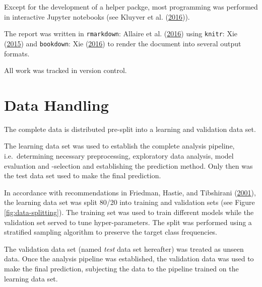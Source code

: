 \documentclass[
  11pt,
  a4paper,
  DIV=12,captions=tableheading,oneside,titlepage=firstiscover,abstracton]{scrreprt}
\begin{document}
Except for the development of a helper packge, most programming was performed in interactive Jupyter notebooks (see Kluyver et al. (\protect\hyperlink{ref-Kluyver:2016aa}{2016})).

The report was written in \texttt{rmarkdown}: Allaire et al. (\protect\hyperlink{ref-allaire2016rmarkdown}{2016}) using \texttt{knitr}: Xie (\protect\hyperlink{ref-xie2015}{2015}) and \texttt{bookdown}: Xie (\protect\hyperlink{ref-xie2016bookdown}{2016}) to render the document into several output formats.

All work was tracked in version control.

\hypertarget{data-handling}{%
\section{Data Handling}\label{data-handling}}

The complete data is distributed pre-split into a learning and validation data set.

The learning data set was used to establish the complete analysis pipeline, i.e.~determining necessary preprocessing, exploratory data analysis, model evaluation and -selection and establishing the prediction method. Only then was the test data set used to make the final prediction.

In accordance with recommendations in Friedman, Hastie, and Tibshirani (\protect\hyperlink{ref-friedman2001elements}{2001}), the learning data set was split 80/20 into training and validation sets (see Figure \ref{fig:data-splitting}). The training set was used to train different models while the validation set served to tune hyper-parameters. The split was performed using a stratified sampling algorithm to preserve the target class frequencies.

The validation data set (named \emph{test} data set hereafter) was treated as unseen data. Once the analysis pipeline was established, the validation data was used to make the final prediction, subjecting the data to the pipeline trained on the learning data set.
\end{document}
